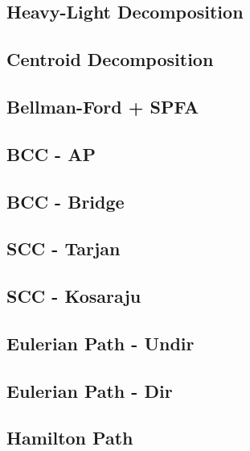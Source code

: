 \documentclass[a4paper,10pt,twocolumn,oneside,x11names]{article}
\begin{document}
\subsection{Heavy-Light Decomposition}


\subsection{Centroid Decomposition}


\subsection{Bellman-Ford + SPFA}


\subsection{BCC - AP}


\subsection{BCC - Bridge}


\subsection{SCC - Tarjan}


\subsection{SCC - Kosaraju}


\subsection{Eulerian Path - Undir}


\subsection{Eulerian Path - Dir}


\subsection{Hamilton Path}

\end{document}
